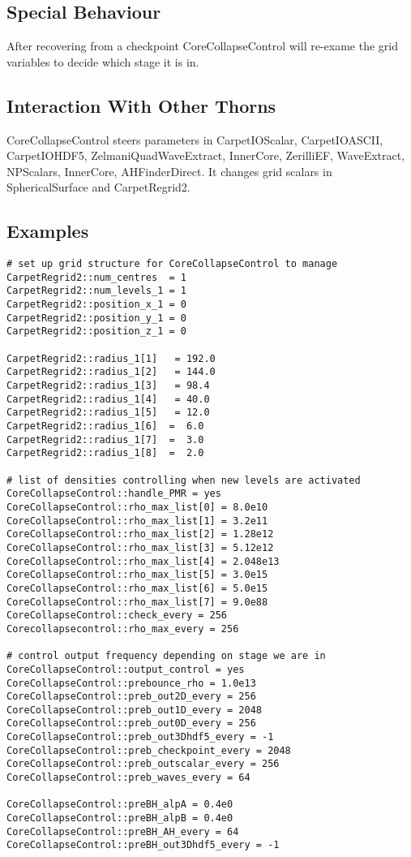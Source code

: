 \subsection{Special Behaviour}
After recovering from a checkpoint CoreCollapseControl will re-exame the grid
variables to decide which stage it is in. 

\subsection{Interaction With Other Thorns}
CoreCollapseControl steers parameters in 
CarpetIOScalar, CarpetIOASCII,  CarpetIOHDF5, 
ZelmaniQuadWaveExtract, InnerCore, ZerilliEF, WaveExtract, NPScalars,
InnerCore, AHFinderDirect. It changes grid scalars in SphericalSurface and
CarpetRegrid2.

\subsection{Examples}
\begin{verbatim}
# set up grid structure for CoreCollapseControl to manage
CarpetRegrid2::num_centres  = 1
CarpetRegrid2::num_levels_1 = 1
CarpetRegrid2::position_x_1 = 0
CarpetRegrid2::position_y_1 = 0
CarpetRegrid2::position_z_1 = 0

CarpetRegrid2::radius_1[1]   = 192.0
CarpetRegrid2::radius_1[2]   = 144.0
CarpetRegrid2::radius_1[3]   = 98.4
CarpetRegrid2::radius_1[4]   = 40.0
CarpetRegrid2::radius_1[5]   = 12.0
CarpetRegrid2::radius_1[6]  =  6.0
CarpetRegrid2::radius_1[7]  =  3.0
CarpetRegrid2::radius_1[8]  =  2.0

# list of densities controlling when new levels are activated
CoreCollapseControl::handle_PMR = yes
CoreCollapseControl::rho_max_list[0] = 8.0e10
CoreCollapseControl::rho_max_list[1] = 3.2e11
CoreCollapseControl::rho_max_list[2] = 1.28e12
CoreCollapseControl::rho_max_list[3] = 5.12e12
CoreCollapseControl::rho_max_list[4] = 2.048e13
CoreCollapseControl::rho_max_list[5] = 3.0e15
CoreCollapseControl::rho_max_list[6] = 5.0e15
CoreCollapseControl::rho_max_list[7] = 9.0e88
CoreCollapseControl::check_every = 256
Corecollapsecontrol::rho_max_every = 256

# control output frequency depending on stage we are in
CoreCollapseControl::output_control = yes
CoreCollapseControl::prebounce_rho = 1.0e13
CoreCollapseControl::preb_out2D_every = 256
CoreCollapseControl::preb_out1D_every = 2048
CoreCollapseControl::preb_out0D_every = 256
CoreCollapseControl::preb_out3Dhdf5_every = -1
CoreCollapseControl::preb_checkpoint_every = 2048
CoreCollapseControl::preb_outscalar_every = 256
CoreCollapseControl::preb_waves_every = 64

CoreCollapseControl::preBH_alpA = 0.4e0
CoreCollapseControl::preBH_alpB = 0.4e0
CoreCollapseControl::preBH_AH_every = 64
CoreCollapseControl::preBH_out3Dhdf5_every = -1
\end{verbatim}

